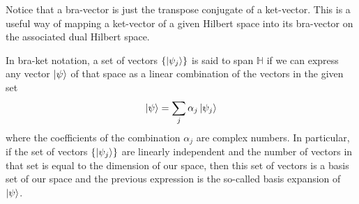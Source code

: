 Notice that a bra-vector is just the transpose conjugate of a ket-vector. This is a useful way of mapping a ket-vector of a given Hilbert space into its bra-vector on the associated dual Hilbert space.
\begin{corollary}{}{}
    In bra-ket notation, a set of vectors $\{\ket{\psi_{j}}\}$ is said to span $\mathbb{H}$ if we can express any vector $\ket{\psi}$ of that space as a linear combination of the vectors in the given set
    \begin{equation}
        \ket{\psi} = \sum_{j}\alpha_{j}\ket{\psi_{j}}
    \end{equation}
    where the coefficients of the combination $\alpha_{j}$ are complex numbers. In particular, if the set of vectors $\{\ket{\psi_{j}}\}$ are linearly independent and the number of vectors in that set is equal to the dimension of our space, then this set of vectors is a basis set of our space and the previous expression is the so-called basis expansion of $\ket{\psi}$.
\end{corollary}
